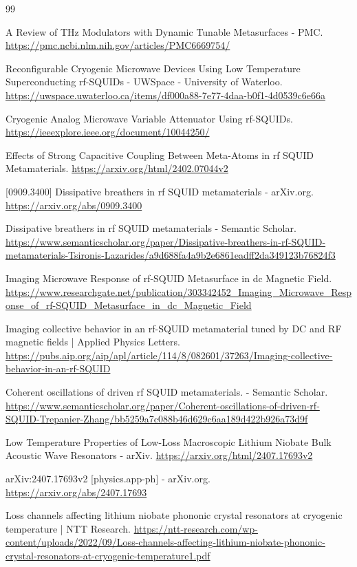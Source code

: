 \documentclass[11pt, a4paper]{article}
\begin{document}
\begin{thebibliography}{99}

 A Review of THz Modulators with Dynamic Tunable Metasurfaces - PMC. \url{https://pmc.ncbi.nlm.nih.gov/articles/PMC6669754/}

 Reconfigurable Cryogenic Microwave Devices Using Low Temperature Superconducting rf-SQUIDs - UWSpace - University of Waterloo. \url{https://uwspace.uwaterloo.ca/items/df000a88-7e77-4daa-b0f1-4d0539c6e66a}

 Cryogenic Analog Microwave Variable Attenuator Using rf-SQUIDs. \url{https://ieeexplore.ieee.org/document/10044250/}

 Effects of Strong Capacitive Coupling Between Meta-Atoms in rf SQUID Metamaterials. \url{https://arxiv.org/html/2402.07044v2}

 [0909.3400] Dissipative breathers in rf SQUID metamaterials - arXiv.org. \url{https://arxiv.org/abs/0909.3400}

 Dissipative breathers in rf SQUID metamaterials - Semantic Scholar. \url{https://www.semanticscholar.org/paper/Dissipative-breathers-in-rf-SQUID-metamaterials-Tsironis-Lazarides/a9d688fa4a9b2e6861eadff2da349123b76824f3}

 Imaging Microwave Response of rf-SQUID Metasurface in dc Magnetic Field. \url{https://www.researchgate.net/publication/303342452_Imaging_Microwave_Response_of_rf-SQUID_Metasurface_in_dc_Magnetic_Field}

 Imaging collective behavior in an rf-SQUID metamaterial tuned by DC and RF magnetic fields | Applied Physics Letters. \url{https://pubs.aip.org/aip/apl/article/114/8/082601/37263/Imaging-collective-behavior-in-an-rf-SQUID}

 Coherent oscillations of driven rf SQUID metamaterials. - Semantic Scholar. \url{https://www.semanticscholar.org/paper/Coherent-oscillations-of-driven-rf-SQUID-Trepanier-Zhang/bb5259a7c088b46d629c6aa189d422b926a73d9f}

 Low Temperature Properties of Low-Loss Macroscopic Lithium Niobate Bulk Acoustic Wave Resonators - arXiv. \url{https://arxiv.org/html/2407.17693v2}

 arXiv:2407.17693v2 [physics.app-ph] - arXiv.org. \url{https://arxiv.org/abs/2407.17693}

 Loss channels affecting lithium niobate phononic crystal resonators at cryogenic temperature | NTT Research. \url{https://ntt-research.com/wp-content/uploads/2022/09/Loss-channels-affecting-lithium-niobate-phononic-crystal-resonators-at-cryogenic-temperature1.pdf}


\end{thebibliography}
\end{document}
